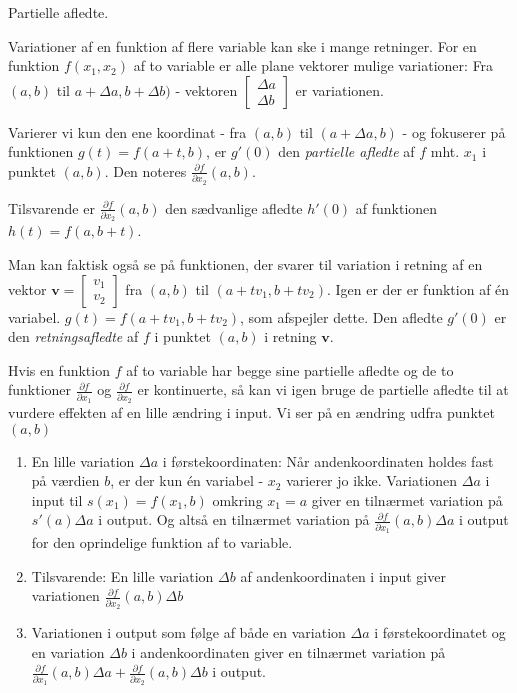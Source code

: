\documentclass[a4paper, 12pt]{article}
\renewcommand{\vec}[1]{{\mathbf #1}}
\theoremstyle{remark}
\begin{document}
\begin{tcolorbox}
\begin{center} Partielle afledte.\end{center}
Variationer af en funktion af flere variable kan ske i mange retninger. For en funktion $f(x_1,x_2)$ af to variable er alle plane vektorer mulige variationer: Fra $(a,b)$ til $a+\Delta a, b+ \Delta b)$ - vektoren $\begin{bmatrix}\Delta a\\ \Delta b\end{bmatrix}$ er variationen. 

Varierer vi kun den ene koordinat - fra $(a,b)$ til $(a+\Delta a, b)$ - og fokuserer på funktionen $g(t)=f(a+t,b)$, er $g'(0)$ den \emph{partielle afledte} af $f$ mht. $x_1$ i punktet $(a,b)$. Den noteres $\frac{\partial f}{\partial x_2}(a,b)$.

Tilsvarende er $\frac{\partial f}{\partial x_2}(a,b)$ den sædvanlige afledte $h'(0)$ af funktionen $h(t)=f(a,b+t)$.

Man kan faktisk også se på funktionen, der svarer til variation i retning af en vektor $\vec{v}=\begin{bmatrix}v_1\\v_2\end{bmatrix}$ fra $(a,b)$ til $(a+ tv_1,b+tv_2)$. 
Igen er der er funktion af én variabel. $g(t)=f(a+ tv_1,b+tv_2)$, som afspejler dette. 
Den afledte $g'(0)$ er den \emph{retningsafledte} af $f$ i punktet $(a,b)$ i retning $\vec{v}$.
\end{tcolorbox}


Hvis en funktion $f$ af to variable har begge sine partielle afledte og de to funktioner $\frac{\partial f}{\partial x_1}$ og $\frac{\partial f}{\partial x_2}$ er kontinuerte, så kan vi igen bruge de partielle afledte til at vurdere effekten af en lille ændring i input.
Vi ser på en ændring udfra punktet $(a,b)$
\begin{enumerate}
\item En lille variation $\Delta a$ i førstekoordinaten: Når andenkoordinaten holdes fast  på værdien $b$, er der kun én variabel - $x_2$ varierer jo ikke. Variationen $\Delta a$ i input til $s(x_1)=f(x_1,b)$ omkring $x_1=a$ giver en tilnærmet variation på $s'(a)\Delta a$ i output. Og altså en tilnærmet variation på $\frac{\partial f}{\partial x_1}(a,b)\Delta a$ i output for den oprindelige funktion af to variable.
\item Tilsvarende: En lille variation $\Delta b$ af andenkoordinaten i input giver variationen $\frac{\partial f}{\partial x_2}(a,b)\Delta b$
\item Variationen i output som følge af både en variation $\Delta a$ i førstekoordinatet og en variation $\Delta b$ i andenkoordinaten giver en tilnærmet variation på $\frac{\partial f}{\partial x_1}(a,b)\Delta a +\frac{\partial f}{\partial x_2}(a,b)\Delta b$ i output. 
\end{enumerate}
\end{document}
